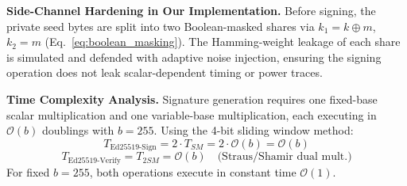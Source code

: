 \documentclass[journal, 10pt, twocolumn]{IEEEtran}
\begin{document}
\textbf{Side-Channel Hardening in Our Implementation.} Before signing, the private seed bytes are split into two Boolean-masked shares via $k_1 = k \oplus m$, $k_2 = m$ (Eq.~\eqref{eq:boolean_masking}). The Hamming-weight leakage of each share is simulated and defended with adaptive noise injection, ensuring the signing operation does not leak scalar-dependent timing or power traces.

\textbf{Time Complexity Analysis.} Signature generation requires one fixed-base scalar multiplication and one variable-base multiplication, each executing in $\mathcal{O}(b)$ doublings with $b = 255$. Using the 4-bit sliding window method:
\begin{equation}
T_{\text{Ed25519-Sign}} = 2 \cdot T_{SM} = 2 \cdot \mathcal{O}(b) = \mathcal{O}(b)
\label{eq:ed25519_sign_complexity}
\end{equation}
\begin{equation}
T_{\text{Ed25519-Verify}} = T_{2SM} = \mathcal{O}(b) \quad \text{(Straus/Shamir dual mult.)}
\label{eq:ed25519_verify_complexity}
\end{equation}
For fixed $b = 255$, both operations execute in constant time $\mathcal{O}(1)$.
\end{document}
